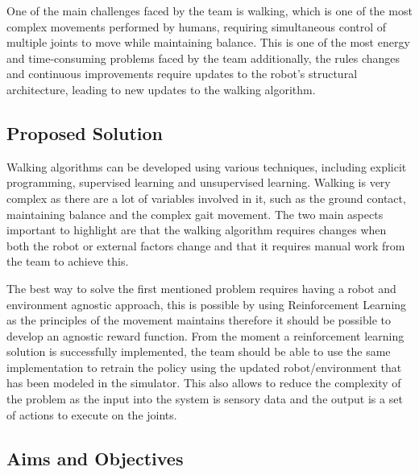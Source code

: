         One of the main challenges faced by the team is walking, which is one of the most complex movements performed by humans, requiring simultaneous control of multiple joints to move while maintaining balance. 
        This is one of the most energy and time-consuming problems faced by the team additionally, the rules changes and continuous improvements require updates to the robot's structural architecture, leading to new updates to the walking algorithm.

        \subsection{Proposed Solution}

        Walking algorithms can be developed using various techniques, 
        including explicit programming, supervised learning and unsupervised learning. 
        Walking is very complex as there are a lot of variables involved in it, such as the ground contact, 
        maintaining balance and the complex gait movement. The two main aspects important to highlight are that the walking algorithm requires changes when both the robot or external factors change and that it requires manual work from the team to achieve this. %

        The best way to solve the first mentioned problem requires having a robot and environment agnostic approach, this is possible by using Reinforcement Learning as the principles of the movement maintains therefore it should be possible to develop an agnostic reward function.
        From the moment a reinforcement learning solution is successfully implemented, the team should be able to use the same implementation to retrain the policy using the updated robot/environment that has been modeled in the simulator.
        This also allows to reduce the complexity of the problem as the input into the system is sensory data and the output is a set of actions to execute on the joints.

        \subsection{Aims and Objectives}
